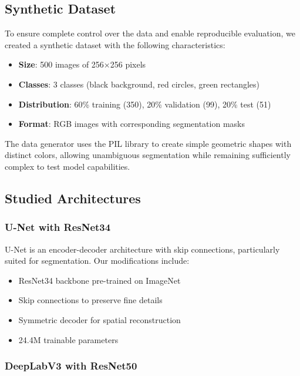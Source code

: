 \documentclass[12pt,a4paper]{article}
\begin{document}
\subsection{Synthetic Dataset}

To ensure complete control over the data and enable reproducible evaluation, we created a synthetic dataset with the following characteristics:

\begin{itemize}
    \item \textbf{Size}: 500 images of 256×256 pixels
    \item \textbf{Classes}: 3 classes (black background, red circles, green rectangles)
    \item \textbf{Distribution}: 60\% training (350), 20\% validation (99), 20\% test (51)
    \item \textbf{Format}: RGB images with corresponding segmentation masks
\end{itemize}

The data generator uses the PIL library to create simple geometric shapes with distinct colors, allowing unambiguous segmentation while remaining sufficiently complex to test model capabilities.

\subsection{Studied Architectures}

\subsubsection{U-Net with ResNet34}

U-Net is an encoder-decoder architecture with skip connections, particularly suited for segmentation. Our modifications include:
\begin{itemize}
    \item ResNet34 backbone pre-trained on ImageNet
    \item Skip connections to preserve fine details
    \item Symmetric decoder for spatial reconstruction
    \item 24.4M trainable parameters
\end{itemize}

\subsubsection{DeepLabV3 with ResNet50}
\end{document}
